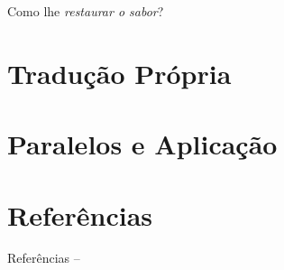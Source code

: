 \documentclass[12pt,aspectratio=169]{beamer}
\newcommand{\YEL}[1]{{\textcolor{TXyel}{#1}}}
\newcommand{\BRI}[1]{{\textcolor{BSpbg}{#1}}}   %
\begin{document}
    \begin{frame}{\BRI{Como lhe \YEL{\textit{restaurar o sabor\/}}?}}
    \end{frame}

\section{Tradução Própria}

\section{Paralelos e Aplicação}

\section{Referências}

    \begin{frame}[allowframebreaks]{Referências -- }
        
        
    \end{frame}

\end{document}
